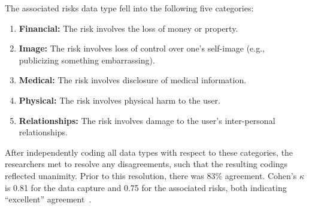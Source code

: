 The associated risks data type fell into the following five categories:

\begin{enumerate}[topsep=0pt,itemsep=-1ex,partopsep=1ex,parsep=1ex]
\item {\bf Financial:} The risk involves the loss of money or property.
\item {\bf Image:} The risk involves loss of control over one's self-image (e.g., publicizing something embarrassing).
\item {\bf Medical:} The risk involves disclosure of medical information.
\item {\bf Physical:} The risk involves physical harm to the user.
\item {\bf Relationships:} The risk involves damage to the user's inter-personal relationships.
\end{enumerate}

After independently coding all data types with respect to these categories, the researchers met to resolve any disagreements, such that the resulting codings reflected unanimity. Prior to this resolution, there was  83\% agreement. Cohen's $\kappa$ is 0.81 for the data capture and 0.75 for the associated risks, both indicating ``excellent'' agreement~\cite{Fleiss2003}.










